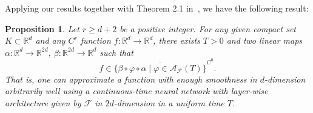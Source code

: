 \documentclass[12pt]{amsart}
\numberwithin{equation}{section}
\newtheorem{proposition}{Proposition}[section]
\theoremstyle{remark}
\begin{document}
Applying our results together with Theorem 2.1 in~\cite{yang2025optimal}, we have the following result:
\begin{proposition}
    \label{prop:finite_time_approximation}
Let $r\ge d+2$ be a positive integer.
For any given compact set $K\subset \mathbb R^d$ and any $C^r$ function $f:\mathbb R^d\to \mathbb R^d$, there exists $T>0$ and two linear maps $\alpha: \mathbb R^d\to \mathbb R^{2d}$, $\beta: \mathbb R^{2d}\to \mathbb R^d$ such that 
\begin{equation}
    f \in \overline{\{\beta \circ \varphi \circ \alpha \mid \varphi\in \mathcal A_{\mathcal F}(T)\}}^{C^0}.
\end{equation}
That is, one can approximate a function with enough smoothness in $d$-dimension arbitrarily well using a  continuous-time neural network with layer-wise architecture given by $\mathcal F$ in $2d$-dimension in a \emph{uniform} time $T$.
\end{proposition}
\end{document}
